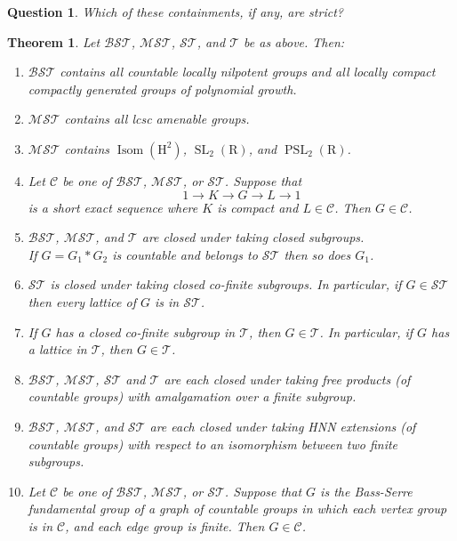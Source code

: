 \documentclass[11pt]{amsart}
\theoremstyle{definition}
\theoremstyle{plain}
\newtheorem{theorem}[definition]{Theorem}
\newtheorem{question}[definition]{Question}
\newcommand{\<}{\langle}
\renewcommand{\>}{\rangle}
\newcommand{\ra}{\rightarrow}
\DeclareMathOperator{\Isom}{Isom}
\DeclareMathOperator{\SL}{SL}
\DeclareMathOperator{\PSL}{PSL}
\newcommand{\R}{\bm{\mathrm{R}}}
\newcommand{\HH}{\bm{\mathrm{H}}}
\newcommand{\BSTreeable}{\bm{\mathscr{BST}}}
\newcommand{\MSTreeable}{\bm{\mathscr{MST}}}
\newcommand{\STreeable}{\bm{\mathscr{ST}}}
\newcommand{\Treeable}{\bm{\mathscr{T}}}
\newcommand{\ClassTreeable}{\bm{\mathscr{C}}}
\begin{document}
\begin{appendices}
\begin{question}\label{q:contain}
Which of these containments, if any, are strict?
\end{question}


\begin{theorem}\label{thm:closure} Let $\BSTreeable$, ${\MSTreeable}$, $\STreeable$, and $\Treeable$ be as above. Then:
\begin{enumerate}
\item $\BSTreeable$ contains all countable locally nilpotent groups and all locally compact compactly generated groups of polynomial growth.

\item ${\MSTreeable}$ contains all lcsc amenable groups.

\item ${\MSTreeable}$ contains $\Isom(\HH ^2)$, $\SL_2(\R )$, and $\PSL_2(\R )$.

\item Let $\ClassTreeable$ be one of $\BSTreeable$, ${\MSTreeable}$, or ${\STreeable}$. Suppose that
\[
1\ra K\ra G \ra L \ra 1
\]
is a short exact sequence where $K$ is compact and $L\in \ClassTreeable$. Then $G\in \ClassTreeable$.

\item $\BSTreeable$, ${\MSTreeable}$, and $\Treeable$ are closed under taking closed subgroups.
\\
If $G=G_1*G_2$ is countable and belongs to $\STreeable$ then so does $G_1$.


\item ${\STreeable}$ is closed under taking closed co-finite subgroups. In particular, if $G\in {\STreeable}$ then every lattice of $G$ is in ${\STreeable}$.

\item If $G$ has a closed co-finite subgroup in $\Treeable$, then $G\in \Treeable$. In particular, if $G$ has a lattice in $\Treeable$, then $G\in \Treeable$.

\item $\BSTreeable$, ${\MSTreeable}$, ${\STreeable}$ and $\Treeable$ are each closed under taking free products (of countable groups) with amalgamation over a finite subgroup.

\item $\BSTreeable$, ${\MSTreeable}$, and ${\STreeable}$ are each closed under taking HNN extensions (of countable groups) with respect to an isomorphism between two finite subgroups.

\item Let $\ClassTreeable$ be one of $\BSTreeable$, ${\MSTreeable}$, or ${\STreeable}$. Suppose that $G$ is the Bass-Serre fundamental group of a graph of countable groups in which each vertex group is in $\ClassTreeable$, and each edge group is finite. Then $G\in \ClassTreeable$.
\end{enumerate}
\end{theorem}


\end{appendices}
\end{document}
